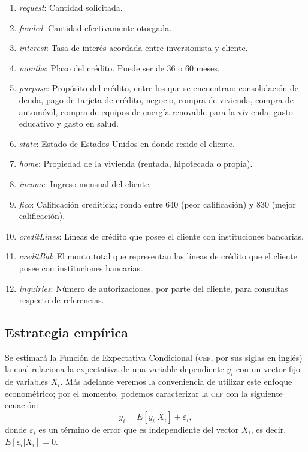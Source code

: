 \documentclass[12pt, fleqn, letterpaper, oneside]{amsart}
\begin{document}
\begin{enumerate}
	\item \emph{request}: Cantidad solicitada.
	\item \emph{funded}: Cantidad efectivamente otorgada.
	\item \emph{interest}: Tasa de interés acordada entre inversionista y cliente.
	\item \emph{months}: Plazo del crédito. Puede ser de 36 o 60 meses. 
	\item \emph{purpose}: Propósito del crédito, entre los que se encuentran: consolidación de deuda, pago de tarjeta de crédito, negocio, compra de vivienda, compra de automóvil, compra de equipos de energía renovable para la vivienda, gasto educativo y gasto en salud.
	\item \emph{state}: Estado de Estados Unidos en donde reside el cliente.
	\item \emph{home}: Propiedad de la vivienda (rentada, hipotecada o propia).
	\item \emph{income}: Ingreso mensual del cliente.
	\item \emph{fico}: Calificación crediticia; ronda entre 640 (peor calificación) y 830 (mejor calificación).
	\item \emph{creditLines}: Líneas de crédito que posee el cliente con instituciones bancarias.
	\item \emph{creditBal}: El monto total que representan las líneas de crédito que el cliente posee con instituciones bancarias.
	\item \emph{inquiries}: Número de autorizaciones, por parte del cliente, para consultas respecto de referencias. 
\end{enumerate}

\subsection{Estrategia empírica}
Se estimará la Función de Expectativa Condicional (\textsc{cef}, por sus siglas en inglés) la cual relaciona la expectativa de una variable dependiente $y_i$ con un vector fijo de variables $X_i$. Más adelante veremos la conveniencia de utilizar este enfoque econométrico; por el momento, podemos caracterizar la \textsc{cef} con la siguiente ecuación:
\begin{equation}
	y_i = E[y_i | X_i] + \varepsilon_i,
\end{equation}
donde $\varepsilon_i$ es un término de error que es independiente del vector $X_i$, es decir, $E[\varepsilon_i | X_i] = 0$. 
\end{document}
